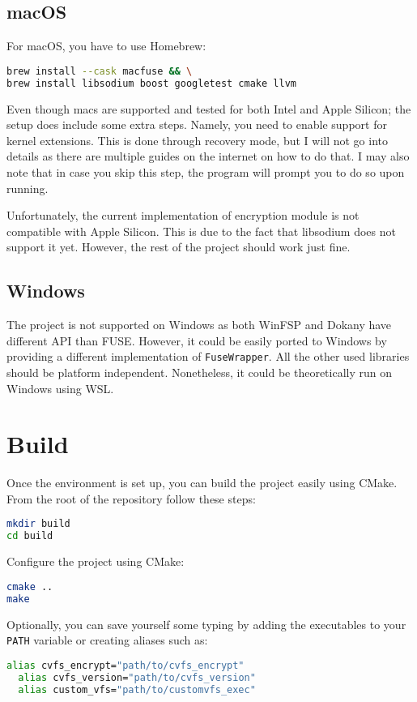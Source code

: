 \subsection*{macOS}

For macOS, you have to use Homebrew:

\begin{lstlisting}[language=bash, basicstyle=\ttfamily\small]
brew install --cask macfuse && \
brew install libsodium boost googletest cmake llvm
\end{lstlisting}

Even though macs are supported and tested for both Intel and Apple Silicon; the setup does include some extra steps.
Namely, you need to enable support for kernel extensions.
This is done through recovery mode, but I will not go into details as there are multiple guides on the internet on how to do that\cite{macos-kext}.
I may also note that in case you skip this step, the program will prompt you to do so upon running.

Unfortunately, the current implementation of encryption module is not compatible with Apple Silicon.
This is due to the fact that libsodium does not support it yet.
However, the rest of the project should work just fine.

\subsection*{Windows}

The project is not supported on Windows as both WinFSP and Dokany have different API than FUSE\@.
However, it could be easily ported to Windows by providing a different implementation of \texttt{FuseWrapper}.
All the other used libraries should be platform independent.
Nonetheless, it could be theoretically run on Windows using WSL\@.

\section*{Build}\label{sec:build}

Once the environment is set up, you can build the project easily using CMake.
From the root of the repository follow these steps:

\begin{lstlisting}[language=bash, basicstyle=\ttfamily\small]
mkdir build
cd build
\end{lstlisting}

\noindent Configure the project using CMake:

\begin{lstlisting}[language=bash, basicstyle=\ttfamily\small]
cmake ..
make
\end{lstlisting}

\noindent Optionally, you can save yourself some typing by adding the executables to your \texttt{PATH} variable or creating aliases such as:

\begin{lstlisting}[language=bash, basicstyle=\ttfamily\small]
  alias cvfs_encrypt="path/to/cvfs_encrypt"
  alias cvfs_version="path/to/cvfs_version"
  alias custom_vfs="path/to/customvfs_exec"
\end{lstlisting}
